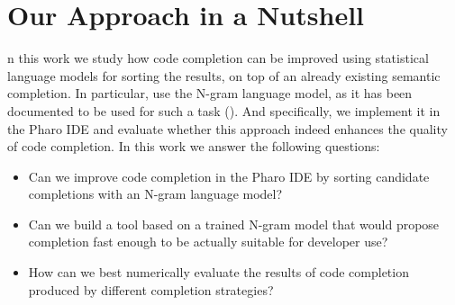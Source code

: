 


\section{Our Approach in a Nutshell}
\label{sec:Introduction-Approach}
n this work we  study how code completion can be improved using statistical language models for sorting the results, on top of an already existing semantic completion. In particular,  use the N-gram language model, as it has been documented to be used for such a task (\cite{Hind12a}). And specifically, we  implement it in the Pharo IDE and evaluate whether this approach indeed enhances the quality of code completion. In  this work we  answer the following questions:
\begin{itemize}
    \item Can we improve code completion in the Pharo IDE by sorting candidate completions with an N-gram language model?
    \item Can we build a tool based on a trained N-gram model that would propose completion fast enough to be actually suitable for developer use? 
    \item How can we best numerically evaluate the results of code completion produced by different completion strategies?
\end{itemize}

